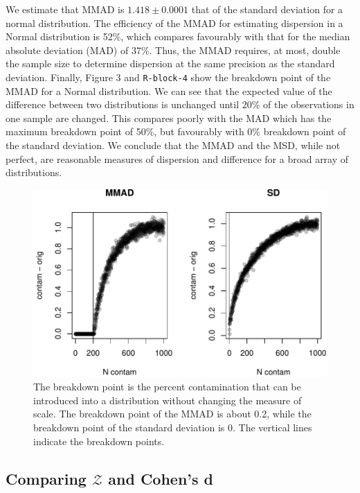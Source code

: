\documentclass[onecolumn]{article}
\begin{document}
We estimate that MMAD is \(1.418 \pm 0.0001\) that of the standard
deviation for a normal distribution. The efficiency of the MMAD for
estimating dispersion in a Normal distribution is 52\%, which compares
favourably with that for the median absolute deviation (MAD) of 37\%.
Thus, the MMAD requires, at most, double the sample size to determine
dispersion at the same precision as the standard deviation. Finally,
Figure 3 and \texttt{R-block-4} show the breakdown point of the MMAD for
a Normal distribution. We can see that the expected value of the
difference between two distributions is unchanged until 20\% of the
observations in one sample are changed. This compares poorly with the
MAD which has the maximum breakdown point of 50\%, but favourably with
0\% breakdown point of the standard deviation. We conclude that the MMAD
and the MSD, while not perfect, are reasonable measures of dispersion
and difference for a broad array of distributions.

\begin{figure}
\centering
\includegraphics{effect_supplement_files/figure-latex/R-block-4-1.pdf}
\caption{The breakdown point is the percent contamination that can be
introduced into a distribution without changing the measure of scale.
The breakdown point of the MMAD is about 0.2, while the breakdown point
of the standard deviation is 0. The vertical lines indicate the
breakdown points.}
\end{figure}

\hypertarget{comparing-mathcalz-and-cohens-d}{%
\subsection{\texorpdfstring{Comparing \(\mathcal{Z}\) and Cohen's
d}{Comparing \textbackslash{}mathcal\{Z\} and Cohen's d}}\label{comparing-mathcalz-and-cohens-d}}
\end{document}

